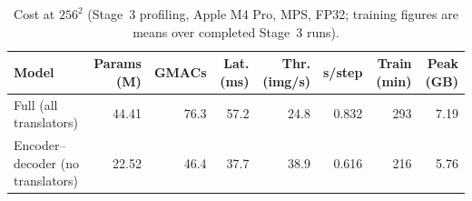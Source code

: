 \begin{table}[t]
\centering
\caption{Cost at $256^2$ (Stage~3 profiling, Apple M4 Pro, MPS, FP32; training figures are means over completed Stage~3 runs).}
\label{tab:efficiency}
\scriptsize
\setlength{\tabcolsep}{3pt}
\begin{tabular}{lrrrrrrr}
\toprule
Model & Params (M) & GMACs & Lat. (ms) & Thr. (img/s) & s/step & Train (min) & Peak (GB) \\
\midrule
Full (all translators) & 44.41 & 76.3 & 57.2 & 24.8 & 0.832 & 293 & 7.19 \\
Encoder--decoder (no translators) & 22.52 & 46.4 & 37.7 & 38.9 & 0.616 & 216 & 5.76 \\
\bottomrule
\end{tabular}
\end{table}
